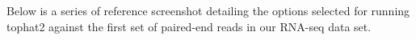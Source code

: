 \documentclass[a4paper,10pt]{article}
\begin{document}
Below is a series of reference screenshot detailing the options selected for running tophat2 against the first set of paired-end reads in our RNA-seq data set.\\
\setlength\fboxsep{0pt}\vspace{1em}
\setlength\fboxsep{0pt}\vspace{1em}
\setlength\fboxsep{0pt}\vspace{1em}
\end{document}

